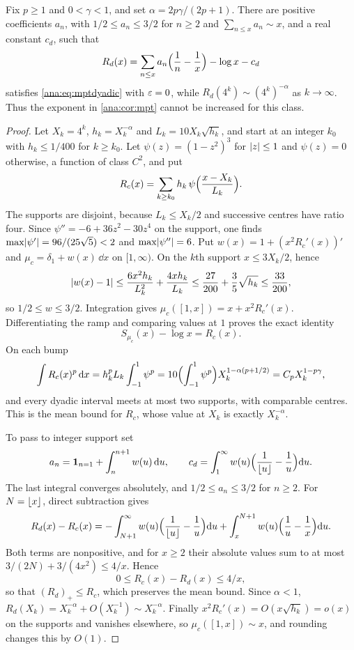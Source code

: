 \begin{proposition}\label{ana:prop:mptsharp}
Fix $p\ge1$ and $0<\gamma<1$, and set $\alpha=2p\gamma/(2p+1)$. There are positive coefficients
$a_n$, with $1/2\le a_n\le3/2$ for $n\ge2$ and $\sum_{n\le x}a_n\sim x$, and a real constant
$c_d$, such that
\[
 R_d(x)=\sum_{n\le x}a_n\Bigl(\frac1n-\frac1x\Bigr)-\log x-c_d
\]
satisfies \eqref{ana:eq:mptdyadic} with $\varepsilon=0$, while $R_d(4^k)\sim(4^k)^{-\alpha}$ as
$k\to\infty$. Thus the exponent in \cref{ana:cor:mpt} cannot be increased for this class.
\end{proposition}

\begin{proof}
Let $X_k=4^k$, $h_k=X_k^{-\alpha}$ and $L_k=10X_k\sqrt{h_k}$, and start at an integer $k_0$
with $h_k\le1/400$ for $k\ge k_0$. Let $\psi(z)=(1-z^2)^3$ for $\lvert z\rvert\le1$ and $\psi(z)=0$
otherwise, a function of class $C^2$, and put
\[
 R_c(x)=\sum_{k\ge k_0}h_k\,\psi\Bigl(\frac{x-X_k}{L_k}\Bigr).
\]
The supports are disjoint, because $L_k\le X_k/2$ and successive centres have ratio four.
Since $\psi''=-6+36z^2-30z^4$ on the support, one finds $\max\lvert\psi'\rvert=96/(25\sqrt5)<2$ and
$\max\lvert\psi''\rvert=6$. Put $w(x)=1+(x^2R_c'(x))'$ and $\mu_c=\delta_1+w(x)\,\dd x$ on
$[1,\infty)$. On the $k$th support $x\le3X_k/2$, hence
\[
 \lvert w(x)-1\rvert\le\frac{6x^2h_k}{L_k^2}+\frac{4xh_k}{L_k}
 \le\frac{27}{200}+\frac35\sqrt{h_k}\le\frac{33}{200},
\]
so $1/2\le w\le3/2$. Integration gives $\mu_c([1,x])=x+x^2R_c'(x)$. Differentiating the ramp and
comparing values at $1$ proves the exact identity
\[
 S_{\mu_c}(x)-\log x=R_c(x).
\]
On each bump
\[
 \int R_c(x)^p\,\mathrm{d} x=h_k^pL_k\int_{-1}^1\psi^p
 =10\Bigl(\int_{-1}^1\psi^p\Bigr)X_k^{1-\alpha(p+1/2)}=C_pX_k^{1-p\gamma},
\]
and every dyadic interval meets at most two supports, with comparable centres. This is the mean
bound for $R_c$, whose value at $X_k$ is exactly $X_k^{-\alpha}$.

To pass to integer support set
\[
 a_n=\mathbf{1}_{n=1}+\int_n^{n+1}w(u)\,\mathrm{d} u,\qquad
 c_d=\int_1^\infty w(u)\Bigl(\frac1{\lfloor u\rfloor}-\frac1u\Bigr)\mathrm{d} u .
\]
The last integral converges absolutely, and $1/2\le a_n\le3/2$ for $n\ge2$. For
$N=\lfloor x\rfloor$, direct subtraction gives
\begin{equation}\label{ana:eq:discreteid}
 R_d(x)-R_c(x)=-\int_{N+1}^\infty w(u)\Bigl(\frac1{\lfloor u\rfloor}-\frac1u\Bigr)\mathrm{d} u
 +\int_x^{N+1}w(u)\Bigl(\frac1u-\frac1x\Bigr)\mathrm{d} u .
\end{equation}
Both terms are nonpositive, and for $x\ge2$ their absolute values sum to at most
$3/(2N)+3/(4x^2)\le4/x$. Hence
\begin{equation}\label{ana:eq:discreteerr}
 0\le R_c(x)-R_d(x)\le4/x ,
\end{equation}
so that $(R_d)_+\le R_c$, which preserves the mean bound. Since $\alpha<1$,
$R_d(X_k)=X_k^{-\alpha}+O(X_k^{-1})\sim X_k^{-\alpha}$. Finally $x^2R_c'(x)=O(x\sqrt{h_k})=o(x)$
on the supports and vanishes elsewhere, so $\mu_c([1,x])\sim x$, and rounding changes this by
$O(1)$.
\end{proof}

